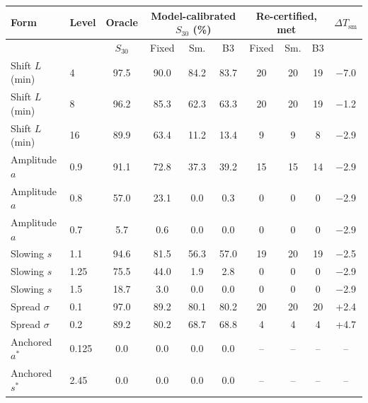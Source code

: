 \begin{tabular}{llcccccccc}
\toprule
Form & Level & Oracle & \multicolumn{3}{c}{Model-calibrated $S_{30}$ (\%)} & \multicolumn{3}{c}{Re-certified, met} & $\Delta T_{\mathrm{sm}}$ \\
\midrule
 & & $S_{30}$ & Fixed & Sm. & B3 & Fixed & Sm. & B3 &  \\
Shift $L$ (min) & 4 & 97.5 & 90.0 & 84.2 & 83.7 & 20 & 20 & 19 & $-$7.0 \\
Shift $L$ (min) & 8 & 96.2 & 85.3 & 62.3 & 63.3 & 20 & 20 & 19 & $-$1.2 \\
Shift $L$ (min) & 16 & 89.9 & 63.4 & 11.2 & 13.4 & 9 & 9 & 8 & $-$2.9 \\
Amplitude $a$ & 0.9 & 91.1 & 72.8 & 37.3 & 39.2 & 15 & 15 & 14 & $-$2.9 \\
Amplitude $a$ & 0.8 & 57.0 & 23.1 & 0.0 & 0.3 & 0 & 0 & 0 & $-$2.9 \\
Amplitude $a$ & 0.7 & 5.7 & 0.6 & 0.0 & 0.0 & 0 & 0 & 0 & $-$2.9 \\
Slowing $s$ & 1.1 & 94.6 & 81.5 & 56.3 & 57.0 & 19 & 20 & 19 & $-$2.5 \\
Slowing $s$ & 1.25 & 75.5 & 44.0 & 1.9 & 2.8 & 0 & 0 & 0 & $-$2.9 \\
Slowing $s$ & 1.5 & 18.7 & 3.0 & 0.0 & 0.0 & 0 & 0 & 0 & $-$2.9 \\
Spread $\sigma$ & 0.1 & 97.0 & 89.2 & 80.1 & 80.2 & 20 & 20 & 20 & +2.4 \\
Spread $\sigma$ & 0.2 & 89.2 & 80.2 & 68.7 & 68.8 & 4 & 4 & 4 & +4.7 \\
Anchored $a^*$ & 0.125 & 0.0 & 0.0 & 0.0 & 0.0 & -- & -- & -- & -- \\
Anchored $s^*$ & 2.45 & 0.0 & 0.0 & 0.0 & 0.0 & -- & -- & -- & -- \\
\bottomrule
\end{tabular}
